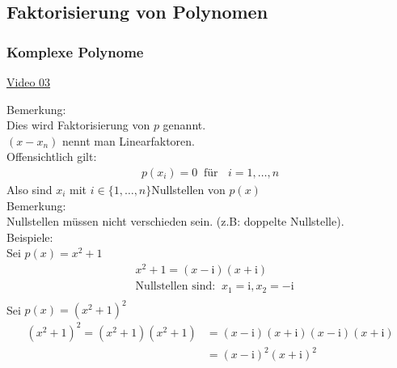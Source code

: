 \subsection{Faktorisierung von Polynomen}
\subsubsection{Komplexe Polynome}
\href{https://youtu.be/hK5Ggr4f8As}{Video 03}\\
\begin{center}
	


\end{center}
Bemerkung:\\
Dies wird Faktorisierung von $ p $ genannt.\\
$ (x-x_n) $ nennt man Linearfaktoren.\vspace*{2mm}\\
Offensichtlich gilt:\\
\begin{align*}
p(x_i)=0\;\;\text{für }\;\;i=1,\ldots,n
\end{align*}
Also sind $ x_i $ mit $ i\in\{1,\ldots,n\} $\;\;Nullstellen von $ p(x) $\vspace*{2mm}\\
Bemerkung:\\
Nullstellen müssen nicht verschieden sein. (z.B: doppelte Nullstelle).\vspace*{2mm}\\
Beispiele:\\
\textbullet\;\;Sei $ p(x)=x^2+1$
\begin{align*}
&x^2+1=(x-\mathrm{i})(x+\mathrm{i})\\
&\text{Nullstellen sind:}\;\;x_1=\mathrm{i}, x_2=-\mathrm{i}\\
\end{align*}
\textbullet\;\;Sei $p(x)=(x^2+1)^2$\\
\begin{align*}
(x^2+1)^2=(x^2+1)(x^2+1)&=(x-\mathrm{i})(x+\mathrm{i})(x-\mathrm{i})(x+\mathrm{i})\\
&=(x-\mathrm{i})^2(x+\mathrm{i})^2
\end{align*}

